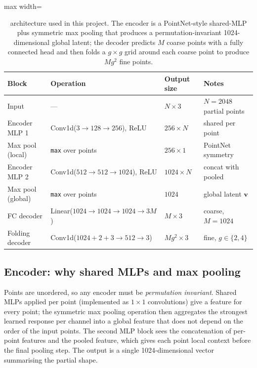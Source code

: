 \begin{table}[H]
  \centering
  \small
  \begin{adjustbox}{max width=\textwidth}
  \begin{tabular}{@{}llll@{}}
    \toprule
    Block & Operation & Output size & Notes \\
    \midrule
    Input & --- & $N \times 3$ & $N = 2048$ partial points \\
    Encoder MLP 1 & Conv1d($3\to128\to256$), ReLU & $256 \times N$ & shared per point \\
    Max pool (local) & \texttt{max} over points & $256 \times 1$ & PointNet symmetry \\
    Encoder MLP 2 & Conv1d($512\to512\to1024$), ReLU & $1024 \times N$ & concat with pooled \\
    Max pool (global) & \texttt{max} over points & $1024$ & global latent $\mathbf{v}$ \\
    FC decoder & Linear($1024\!\to\!1024\!\to\!1024\!\to\!3M$) & $M \times 3$ & coarse, $M = 1024$ \\
    Folding decoder & Conv1d($1024{+}2{+}3 \to 512 \to 3$) & $M g^2 \times 3$ & fine, $g \in \{2,4\}$ \\
    \bottomrule
  \end{tabular}
  \end{adjustbox}
  \caption{\pcn{} architecture used in this project. The encoder is a
  PointNet-style shared-MLP plus symmetric max pooling that produces a
  permutation-invariant 1024-dimensional global latent; the decoder predicts
  $M$ coarse points with a fully connected head and then folds a $g\times g$
  grid around each coarse point to produce $M g^2$ fine points.}
  \label{tab:pcn_arch}
\end{table}

\subsection{Encoder: why shared MLPs and max pooling}
Points are unordered, so any encoder must be \emph{permutation invariant}.
Shared MLPs applied per point (implemented as $1\times1$ convolutions) give a
feature for every point; the symmetric max pooling operation then aggregates
the strongest learned response per channel into a global feature that does not
depend on the order of the input points. The second MLP block sees the
concatenation of per-point features and the pooled feature, which gives each
point local context before the final pooling step. The output is a single
1024-dimensional vector summarising the partial shape.

